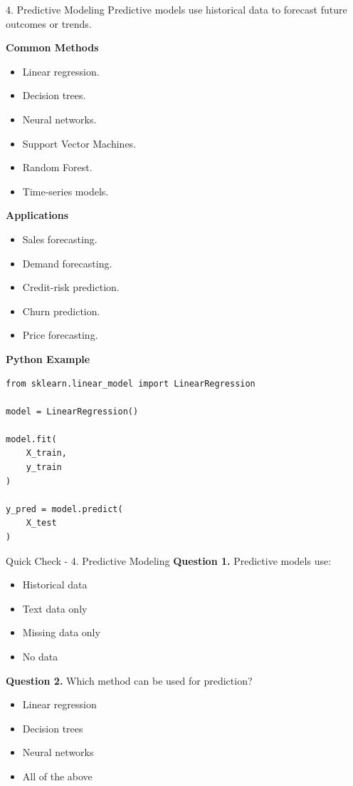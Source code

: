 \documentclass[aspectratio=169,11pt]{beamer}
\begin{document}
\begin{frame}{4. Predictive Modeling}
\small
Predictive models use historical data to forecast future outcomes or trends.\par\medskip
\textbf{Common Methods}\par\medskip
\begin{itemize}
\item Linear regression.
\item Decision trees.
\item Neural networks.
\item Support Vector Machines.
\item Random Forest.
\item Time-series models.
\end{itemize}
\textbf{Applications}\par\medskip
\begin{itemize}
\item Sales forecasting.
\item Demand forecasting.
\item Credit-risk prediction.
\item Churn prediction.
\item Price forecasting.
\end{itemize}
\textbf{Python Example}\par\medskip
\begin{lstlisting}[style=py]
from sklearn.linear_model import LinearRegression

model = LinearRegression()

model.fit(
    X_train,
    y_train
)

y_pred = model.predict(
    X_test
)
\end{lstlisting}
\end{frame}
\begin{frame}[allowframebreaks]{Quick Check - 4. Predictive Modeling}
\footnotesize
\textbf{Question 1.} Predictive models use:\par\medskip
\begin{itemize}
\item[\textbf{A.}] Historical data
\item[\textbf{B.}] Text data only
\item[\textbf{C.}] Missing data only
\item[\textbf{D.}] No data
\end{itemize}
\textbf{Question 2.} Which method can be used for prediction?\par\medskip
\begin{itemize}
\item[\textbf{A.}] Linear regression
\item[\textbf{B.}] Decision trees
\item[\textbf{C.}] Neural networks
\item[\textbf{D.}] All of the above
\end{itemize}
\end{frame}
\end{document}
